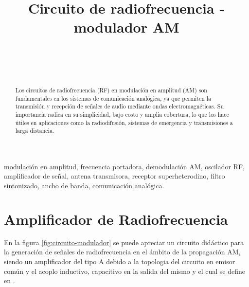 \documentclass[conference]{IEEEtran}
\begin{document}
	
	\title{Circuito de radiofrecuencia - modulador AM}
	\author{
		\\
		\\
		\\
		\and
		\and
	}
	
	\maketitle
	\begin{abstract}
		Los circuitos de radiofrecuencia (RF) en modulación en amplitud (AM) son fundamentales en los sistemas de comunicación analógica, ya que permiten la transmisión y recepción de señales de audio mediante ondas electromagnéticas. Su importancia radica en su simplicidad, bajo costo y amplia cobertura, lo que los hace útiles en aplicaciones como la radiodifusión, sistemas de emergencia y transmisiones a larga distancia.
	\end{abstract}
	
	\begin{IEEEkeywords}
		modulación en amplitud, frecuencia portadora, demodulación AM, oscilador RF, amplificador de señal, antena transmisora, receptor superheterodino, filtro sintonizado, ancho de banda, comunicación analógica.
	\end{IEEEkeywords}
	
	\section{Amplificador de Radiofrecuencia}
	
	En la figura \ref{fig:circuito-modulador} se puede apreciar un circuito didáctico para la generación de señales de radiofrecuencia en el ámbito de la propagación AM, siendo un amplificador del tipo A debido a la topologia del circuito en emisor común y el acoplo inductivo, capacitivo en la salida del mismo y el cual se define en \cite{boylestad2010}.
	
\end{document}
